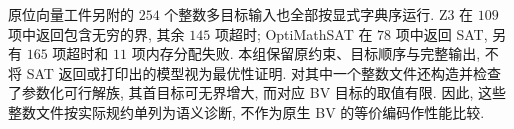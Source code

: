 
原位向量工件另附的 $254$ 个整数多目标输入也全部按显式字典序运行. Z3 在 $109$ 项中返回包含无穷的界, 其余 $145$ 项超时; OptiMathSAT 在 $78$ 项中返回 SAT, 另有 $165$ 项超时和 $11$ 项内存分配失败. 本组保留原约束、目标顺序与完整输出, 不将 SAT 返回或打印出的模型视为最优性证明. 对其中一个整数文件还构造并检查了参数化可行解族, 其首目标可无界增大, 而对应 BV 目标的取值有限. 因此, 这些整数文件按实际规约单列为语义诊断, 不作为原生 BV 的等价编码作性能比较.
